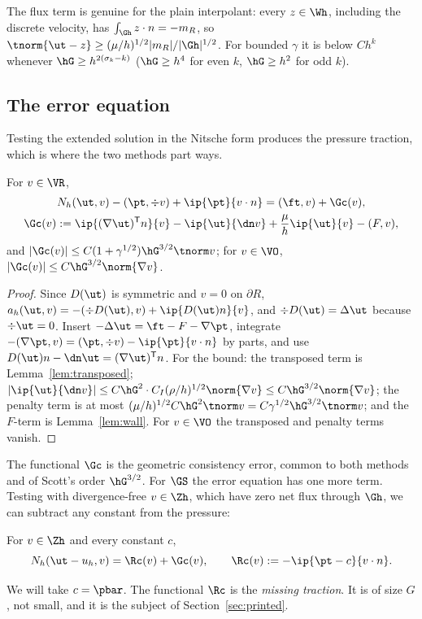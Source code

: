 The flux term is genuine for the plain interpolant: every $z\in\Wh$, including the discrete velocity, has $\int_{\Gh}z\cdot n=-m_R$, so $\tnorm{\ut-z}\ge(\mu/h)^{1/2}|m_R|/|\Gh|^{1/2}$. For bounded $\gamma$ it is below $Ch^k$ whenever $\hG\ge h^{2(\sigma_k-k)}$ ($\hG\ge h^4$ for even $k$, $\hG\ge h^2$ for odd $k$).

\subsection{The error equation}
Testing the extended solution in the Nitsche form produces the pressure traction, which is where the two methods part ways.

\begin{lemma}\label{lem:erroreq}
For $v\in\VR$,
\begin{gather*}
N_h(\ut,v)-(\pt,\div v)+\ip{\pt}{v\cdot n}=(\ft,v)+\Gc(v),\\
\Gc(v):=\ip{(\nabla\ut)^{\mathsf T}n}{v}-\ip{\ut}{\dn v}+\frac\mu h\ip{\ut}{v}-(F,v),
\end{gather*}
and $|\Gc(v)|\le C(1+\gamma^{1/2})\hG^{3/2}\tnorm v$; for $v\in\VO$, $|\Gc(v)|\le C\hG^{3/2}\norm{\nabla v}$.
\end{lemma}

\begin{proof}
Since $D(\ut)$ is symmetric and $v=0$ on $\partial R$, $a_h(\ut,v)=-(\div D(\ut),v)+\ip{D(\ut)n}{v}$, and $\div D(\ut)=\Delta\ut$ because $\div\ut=0$. Insert $-\Delta\ut=\ft-F-\nabla\pt$, integrate $-(\nabla\pt,v)=(\pt,\div v)-\ip{\pt}{v\cdot n}$ by parts, and use $D(\ut)n-\dn\ut=(\nabla\ut)^{\mathsf T}n$. For the bound: the transposed term is Lemma~\ref{lem:transposed}; $|\ip{\ut}{\dn v}|\le C\hG^2\cdot C_I(\rho/h)^{1/2}\norm{\nabla v}\le C\hG^{3/2}\norm{\nabla v}$; the penalty term is at most $(\mu/h)^{1/2}C\hG^2\tnorm v=C\gamma^{1/2}\hG^{3/2}\tnorm v$; and the $F$-term is Lemma~\ref{lem:wall}. For $v\in\VO$ the transposed and penalty terms vanish.
\end{proof}

The functional $\Gc$ is the geometric consistency error, common to both methods and of Scott's order $\hG^{3/2}$. For $\GS$ the error equation has one more term. Testing with divergence-free $v\in\Zh$, which have zero net flux through $\Gh$, we can subtract any constant from the pressure:

\begin{corollary}\label{cor:GSerr}
For $v\in\Zh$ and every constant $c$,
\[
N_h(\ut-u_h,v)=\Rc(v)+\Gc(v),\qquad \Rc(v):=-\ip{\pt-c}{v\cdot n}.
\]
\end{corollary}
We will take $c=\pbar$. The functional $\Rc$ is the \emph{missing traction}. It is of size $G$, not small, and it is the subject of Section~\ref{sec:printed}.

